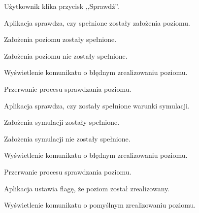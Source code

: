 \documentclass[12pt, a4paper]{article} %
\begin{document}
\hfill \break
\begin{usecase}
	\noaka
	\addpath
	\begin{usecases}
		\item Użytkownik klika przycisk ,,Sprawdź''.
		\item Aplikacja sprawdza, czy spełnione zostały założenia poziomu.
		\item Założenia poziomu zostały spełnione.
		\begin{usecases}
			\item Założenia poziomu nie zostały spełnione.
			\begin{usecases}
				\item Wyświetlenie komunikatu o błędnym zrealizowaniu poziomu.
				\item Przerwanie procesu sprawdzania poziomu.
			\end{usecases}
		\end{usecases}
		\item Aplikacja sprawdza, czy zostały spełnione warunki symulacji.
		\item Założenia symulacji zostały spełnione.
		\begin{usecases}
			\item Założenia symulacji nie zostały spełnione.
			\begin{usecases}
				\item Wyświetlenie komunikatu o błędnym zrealizowaniu poziomu.
				\item Przerwanie procesu sprawdzania poziomu.
			\end{usecases}
		\end{usecases}
		\item Aplikacja ustawia flagę, że poziom został zrealizowany.
		\item Wyświetlenie komunikatu o pomyślnym zrealizowaniu poziomu.
	\end{usecases}
\end{usecase}
\end{document}
